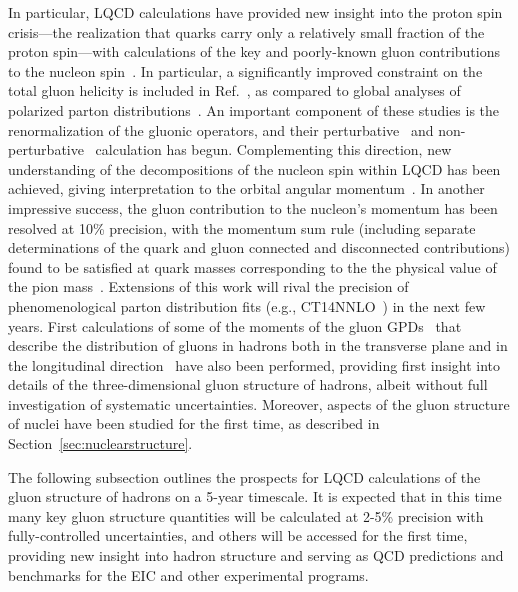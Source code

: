 In particular, LQCD calculations have provided new insight into the proton spin crisis---the realization that quarks carry only a relatively small fraction of the proton spin---with calculations of the key and poorly-known gluon contributions to the nucleon spin~\cite{Alexandrou:2017oeh,Yang:2016plb}. In particular, a significantly improved constraint on the total gluon helicity is included in Ref.~\cite{Yang:2016plb}, as compared to global analyses of polarized parton distributions~\cite{deFlorian:2014yva}. An important component of these studies is the renormalization of the gluonic operators, and their perturbative~\cite{Glatzmaier:2014sya,Alexandrou:2017oeh} and non-perturbative~\cite{paper by Yibo et al to appear next week} calculation has begun. Complementing this direction, new understanding of the decompositions of the nucleon spin within LQCD has been achieved, giving interpretation to the   orbital angular momentum~\cite{Engelhardt:2017miy}. 
%
In another impressive success, the gluon contribution to the nucleon's momentum has been resolved at 10\% precision, with the momentum sum rule (including separate determinations of the quark and gluon connected and disconnected contributions) found to be satisfied at quark masses corresponding to the the physical value of the pion mass~\cite{Alexandrou:2017oeh}. Extensions of this work will rival the precision of phenomenological parton distribution fits (e.g., CT14NNLO~\cite{Dulat:2015mca}) in the next few years.
%
First calculations of some of the moments of the gluon GPDs~\cite{Diehl:2003ny} that describe the distribution of gluons in hadrons both in the transverse plane and in the longitudinal direction~\cite{Detmold:2016gpy,Detmold:2017oqb} have also been performed, providing first insight into details of the three-dimensional gluon structure of hadrons, albeit without full investigation of systematic uncertainties. 
Moreover, aspects of the gluon structure of nuclei have been studied for the first time,  as described in Section~\ref{sec:nuclearstructure}.

The following subsection outlines the prospects for LQCD calculations of the gluon structure of hadrons on a 5-year timescale. It is expected that in this time many key gluon structure quantities will be calculated at 2-5\% precision with fully-controlled uncertainties, and others will be accessed for the first time, providing new insight into hadron structure and serving as QCD predictions and benchmarks for the EIC and other experimental programs.




